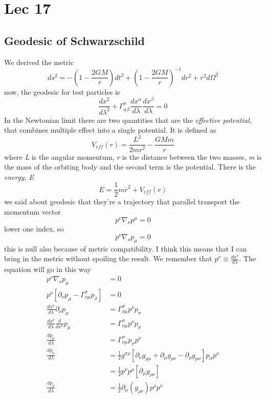 \section{Lec 17}
\subsection{Geodesic of Schwarzschild}
We derived the metric 
\[
ds^{2} = - \left( 1- \frac{2GM}{r} \right)dt^{2} + \left( 1- \frac{2GM}{r} \right)^{-1}dr^{2} + r^{2} d\Omega ^{2}
\]
now, the geodesic for test particles is
\[
\frac{d x^{2}}{d \lambda ^{2}} + \Gamma ^{\mu }_{\alpha \beta } \frac{d x^{\alpha }}{d \lambda }\frac{d x^{\beta }}{d \lambda } = 0
\]
In the Newtonian limit there are two quantities that are the \emph{effective potential}, that combines multiple effect into a single potential. It is defined as
\[
V_{eff}\left( r \right) = \frac{L^{2}}{2mr^{2}} - \frac{GMm}{r}
\]
where \emph{L} is the angular momentum, \emph{r} is the distance between the two masses, \emph{m} is the mass of the orbiting body and the second term is the potential.
There is the \emph{energy, E}
\[
	E = \frac{1}{2}m\dot{r}^{2} + V_{eff}\left( r \right)
\]
we said about geodesic that they're a trajectory that parallel transport  the momentum vector
\[
p^{\nu }\nabla _{\nu }p^{\mu } = 0
\]
lower one index, so
\[
p^{\nu }\nabla _{\nu }p_{\mu } = 0
\]
this is null also because of metric compatibility. I think this means that I can bring in the metric without spoiling the result. We remember that $p^{\nu } \equiv \frac{d x^{\nu }}{d \lambda }$.
The equation will go in this way
\begin{align}
	p^{\nu }\nabla _{\nu }p_{\mu } &= 0 \nonumber \\
	p^{\nu }\left[ \partial_{\nu }p_{\mu } - \Gamma ^{\sigma }_{\nu \mu }p_{\sigma } \right] & = 0 \nonumber \\
	\frac{d x^{\nu }}{d \lambda } \partial_{\nu }p_{\mu } &= \Gamma ^{\sigma }_{\nu \mu }p^{\nu }p_{\sigma } \nonumber \\
	\frac{d x^{\nu }}{d \lambda }\frac{d }{d x^{ \nu }}p_{\mu } & = \Gamma ^{\sigma }_{\nu \mu }p^{\nu }p_{\sigma } \nonumber\\
	\frac{d p_{\mu }}{d \lambda } &= \Gamma ^{\sigma }_{\nu \mu } p_{\sigma }p^{\nu } \nonumber\\
	\frac{d p_{\mu }}{d \lambda } &= \frac{1}{2}g^{\sigma \rho } \left[ \partial_{\nu }g_{\rho \mu } + \partial_{\mu }g_{\rho \nu } - \partial_{\rho }g_{\mu \nu } \right] p_{\sigma }p^{\nu } \nonumber \\
				      &= \frac{1}{2} p^{\nu }p^{\rho } \left[ \partial_{\mu }g_{\rho \nu } \right] \nonumber \\
				     \frac{d p_{\mu }}{d \lambda } &= \frac{1}{2} \partial_{\mu }\left( g_{\rho \nu } \right) p^{\rho }p^{\nu } \\
\end{align}
